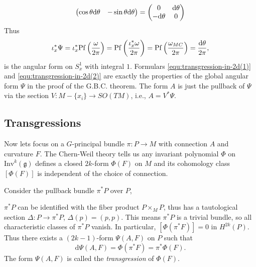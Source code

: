 \begin{remark}
\begin{align*}
\begin{pmatrix}
            \cos\theta{\rm d}\theta & -\sin\theta{\rm d}\theta
        \end{pmatrix} 
        = 
        \begin{pmatrix}
            0 & {\rm d}\theta \\
            -{\rm d}\theta & 0
        \end{pmatrix}
    \end{align*}
    Thus 
    \begin{equation}\label{equ:transgression-in-2d(2)}
        \iota_x^* \Psi = \iota_x^* \mathrm{Pf}\left(\frac{\omega}{2\pi}\right) = \mathrm{Pf}\left(\frac{\iota_x^* \omega}{2\pi}\right) 
        = \mathrm{Pf}\left(\frac{\omega_{MC}}{2\pi}\right) = \frac{{\rm d}\theta}{2\pi},
    \end{equation}
    is the angular form on $S^1_x$ with integral $1$. Formulars \eqref{equ:transgression-in-2d(1)} 
    and \eqref{equ:transgression-in-2d(2)} are exactly the properties of 
    the global angular form $\Psi$ in the proof of the G.B.C. theorem. 
    The form $A$ is just the pullback of $\Psi$ via the section $V:M-\{x_i\} \to SO(TM)$, i.e., $A = V^* \Psi$.
\end{remark}

\subsection{Transgressions} 
Now lets focus on a $G$-principal bundle $\pi: P \to M$ with connection $A$ and curvature $F$. 
The Chern-Weil theory tells us any invariant polynomial $\Phi$ on $\mathrm{Inv}^k(\mathfrak{g})$ defines
a closed $2k$-form $\Phi(F)$ on $M$ 
and its cohomology class $[\Phi(F)]$ is independent of the choice of connection. 

Consider the pullback bundle $\pi^*P$ over $P$, 
\begin{center}
\end{center}
$\pi^*P$ can be identified with the fiber product $P \times_M P$, 
thus has a tautological section $\Delta: P \to \pi^*P$, $\Delta(p) = (p,p)$. 
This means $\pi^*P$ is a trivial bundle, so all characteristic classes of $\pi^*P$ vanish. 
In particular, $[\Phi(\pi^*F)] = 0$ in $H^{2k}(P)$. 
Thus there exists a $(2k-1)$-form $\Psi(A,F)$ on $P$ such that
\begin{equation*}
    \mathrm{d}\Psi(A,F) = \Phi(\pi^*F) = \pi^* \Phi(F).
\end{equation*}
The form $\Psi(A,F)$ is called the \emph{transgression} of $\Phi(F)$. 

